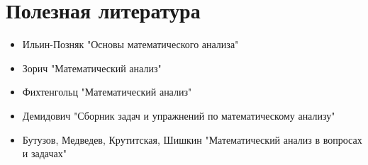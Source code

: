 \documentclass{article}
\begin{document}
    \section{Полезная литература}
    \begin{itemize}
        \item Ильин-Позняк "Основы математического анализа"
        \item Зорич "Математический анализ"
        \item Фихтенгольц "Математический анализ"
        \item Демидович "Сборник задач и упражнений по математическому анализу"
        \item Бутузов, Медведев, Крутитская, Шишкин "Математический анализ в вопросах и задачах"
    \end{itemize}
\end{document}
